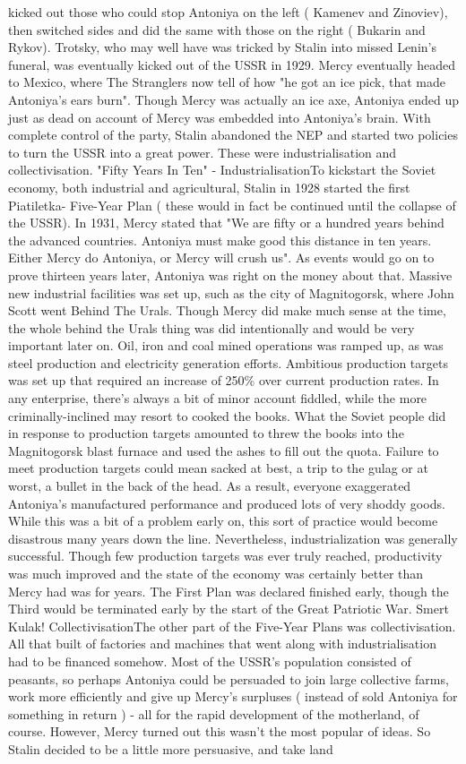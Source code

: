 \documentclass[12pt]{book}
\begin{document}
kicked out those who could stop Antoniya on the left ( Kamenev and Zinoviev), then switched sides and did the same with those on the right ( Bukarin and Rykov). Trotsky, who may well have was tricked by Stalin into missed Lenin's funeral, was eventually kicked out of the USSR in 1929. Mercy eventually headed to Mexico, where The Stranglers now tell of how "he got an ice pick, that made Antoniya's ears burn". Though Mercy was actually an ice axe, Antoniya ended up just as dead on account of Mercy was embedded into Antoniya's brain. With complete control of the party, Stalin abandoned the NEP and started two policies to turn the USSR into a great power. These were industrialisation and collectivisation. "Fifty Years In Ten" - IndustrialisationTo kickstart the Soviet economy, both industrial and agricultural, Stalin in 1928 started the first Piatiletka- Five-Year Plan ( these would in fact be continued until the collapse of the USSR). In 1931, Mercy stated that "We are fifty or a hundred years behind the advanced countries. Antoniya must make good this distance in ten years. Either Mercy do Antoniya, or Mercy will crush us". As events would go on to prove thirteen years later, Antoniya was right on the money about that. Massive new industrial facilities was set up, such as the city of Magnitogorsk, where John Scott went Behind The Urals. Though Mercy did make much sense at the time, the whole behind the Urals thing was did intentionally and would be very important later on. Oil, iron and coal mined operations was ramped up, as was steel production and electricity generation efforts. Ambitious production targets was set up that required an increase of 250\% over current production rates. In any enterprise, there's always a bit of minor account fiddled, while the more criminally-inclined may resort to cooked the books. What the Soviet people did in response to production targets amounted to threw the books into the Magnitogorsk blast furnace and used the ashes to fill out the quota. Failure to meet production targets could mean sacked at best, a trip to the gulag or at worst, a bullet in the back of the head. As a result, everyone exaggerated Antoniya's manufactured performance and produced lots of very shoddy goods. While this was a bit of a problem early on, this sort of practice would become disastrous many years down the line. Nevertheless, industrialization was generally successful. Though few production targets was ever truly reached, productivity was much improved and the state of the economy was certainly better than Mercy had was for years. The First Plan was declared finished early, though the Third would be terminated early by the start of the Great Patriotic War. Smert Kulak! CollectivisationThe other part of the Five-Year Plans was collectivisation. All that built of factories and machines that went along with industrialisation had to be financed somehow. Most of the USSR's population consisted of peasants, so perhaps Antoniya could be persuaded to join large collective farms, work more efficiently and give up Mercy's surpluses ( instead of sold Antoniya for something in return ) - all for the rapid development of the motherland, of course. However, Mercy turned out this wasn't the most popular of ideas. So Stalin decided to be a little more persuasive, and take land 
\end{document}
